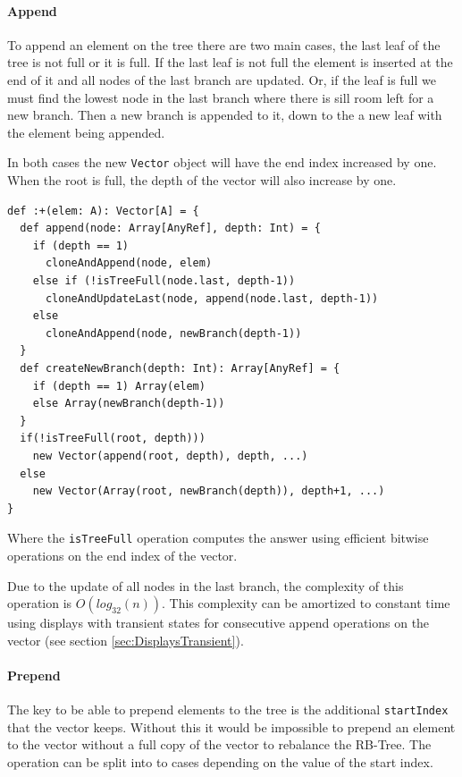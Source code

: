 \paragraph{Append}
To append an element on the tree there are two main cases, the last leaf of the tree is not full or it is full. If the last leaf is not full the element is inserted at the end of it and all nodes of the last branch are updated. Or, if the leaf is full we must find the lowest node in the last branch where there is sill room left for a new branch. Then a new branch is appended to it, down to the a new leaf with the element being appended. 

In both cases the new \texttt{Vector} object will have the end index increased by one. When the root is full, the depth of the vector will also increase by one.

\begin{lstlisting}[frame=single]
def :+(elem: A): Vector[A] = {
  def append(node: Array[AnyRef], depth: Int) = {
    if (depth == 1) 
      cloneAndAppend(node, elem)
    else if (!isTreeFull(node.last, depth-1)) 
      cloneAndUpdateLast(node, append(node.last, depth-1))
    else
      cloneAndAppend(node, newBranch(depth-1))
  }
  def createNewBranch(depth: Int): Array[AnyRef] = {
    if (depth == 1) Array(elem)
    else Array(newBranch(depth-1))
  }
  if(!isTreeFull(root, depth))) 
    new Vector(append(root, depth), depth, ...)
  else 
    new Vector(Array(root, newBranch(depth)), depth+1, ...)
}
\end{lstlisting}

Where the \texttt{isTreeFull} operation computes the answer using efficient bitwise operations on the end index of the vector.

Due to the update of all nodes in the last branch, the complexity of this operation is $O(log_{32}(n))$. This complexity can be amortized to constant time using displays with transient states for consecutive append operations on the vector (see section \ref{sec:DisplaysTransient}).

\paragraph{Prepend}
The key to be able to prepend  elements to the tree is the additional \texttt{startIndex} that the vector keeps. Without this it would be impossible to prepend an element to the vector without a full copy of the vector to rebalance the RB-Tree. The operation can be split into to cases depending on the value of the start index.

